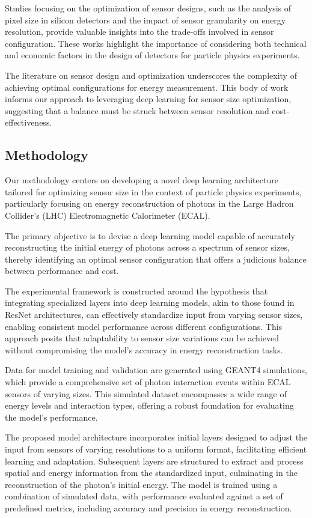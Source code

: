 \documentclass[conference]{IEEEtran}
\begin{document}
Studies focusing on the optimization of sensor designs, such as the analysis of pixel size in silicon detectors and the impact of sensor granularity on energy resolution, provide valuable insights into the trade-offs involved in sensor configuration. These works highlight the importance of considering both technical and economic factors in the design of detectors for particle physics experiments.

The literature on sensor design and optimization underscores the complexity of achieving optimal configurations for energy measurement. This body of work informs our approach to leveraging deep learning for sensor size optimization, suggesting that a balance must be struck between sensor resolution and cost-effectiveness.

\subsection{Methodology}
Our methodology centers on developing a novel deep learning architecture tailored for optimizing sensor size in the context of particle physics experiments, particularly focusing on energy reconstruction of photons in the Large Hadron Collider's (LHC) Electromagnetic Calorimeter (ECAL).

The primary objective is to devise a deep learning model capable of accurately reconstructing the initial energy of photons across a spectrum of sensor sizes, thereby identifying an optimal sensor configuration that offers a judicious balance between performance and cost.

The experimental framework is constructed around the hypothesis that integrating specialized layers into deep learning models, akin to those found in ResNet architectures, can effectively standardize input from varying sensor sizes, enabling consistent model performance across different configurations. This approach posits that adaptability to sensor size variations can be achieved without compromising the model's accuracy in energy reconstruction tasks.

Data for model training and validation are generated using GEANT4 simulations, which provide a comprehensive set of photon interaction events within ECAL sensors of varying sizes. This simulated dataset encompasses a wide range of energy levels and interaction types, offering a robust foundation for evaluating the model's performance.

The proposed model architecture incorporates initial layers designed to adjust the input from sensors of varying resolutions to a uniform format, facilitating efficient learning and adaptation. Subsequent layers are structured to extract and process spatial and energy information from the standardized input, culminating in the reconstruction of the photon's initial energy. The model is trained using a combination of simulated data, with performance evaluated against a set of predefined metrics, including accuracy and precision in energy reconstruction.
\end{document}
